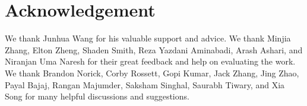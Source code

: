 \section*{Acknowledgement}

We thank Junhua Wang for his valuable support and advice. We thank Minjia
Zhang, Elton Zheng, Shaden Smith, Reza Yazdani Aminabadi, Arash Ashari, and
Niranjan Uma Naresh for their great feedback and help on evaluating the work.
We thank Brandon Norick, Corby Rossett, Gopi Kumar, Jack Zhang, Jing Zhao,
Payal Bajaj, Rangan Majumder, Saksham Singhal, Saurabh Tiwary, and Xia Song for
many helpful discussions and suggestions.

